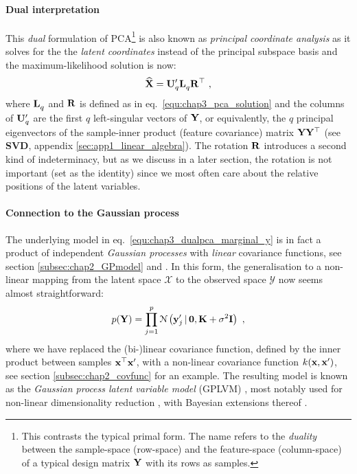       \paragraph{Dual interpretation} This \emph{dual} formulation of PCA\footnote{This contrasts the typical primal form. The name refers to the \emph{duality} between the sample-space (row-space) and the feature-space (column-space) of a typical design matrix $\mathbf{Y}$ with its rows as samples.} is also known as \textit{principal coordinate analysis} as it solves for the the \emph{latent coordinates} instead of the principal subspace basis and the maximum-likelihood solution is now:
      \[
        \widehat{\mathbf{X}} = \mathbf{U}^\prime_q \mathbf{L}^{~}_q \mathbf{R}^\top ~,
      \]
      where $\mathbf{L}^{~}_q$ and $\mathbf{R}$ is defined as in eq.~\eqref{equ:chap3_pca_solution} and the columns of $\mathbf{U}^\prime_q$ are the first $q$ left-singular vectors of $\mathbf{Y}$, or equivalently, the $q$ principal eigenvectors of the sample-inner product (feature covariance) matrix $\mathbf{Y}\mathbf{Y}^\top$ (see \textbf{SVD}, appendix \ref{sec:app1_linear_algebra}). The rotation $\mathbf{R}$ introduces a second kind of indeterminacy, but as we discuss in a later section, the rotation is not important (set as the identity) since we most often care about the relative positions of the latent variables.

      \paragraph{Connection to the Gaussian process} The underlying model in eq.~\eqref{equ:chap3_dualpca_marginal_y} is in fact a product of independent \emph{Gaussian processes} with \emph{linear} covariance functions, see section \ref{subsec:chap2_GPmodel} and \citep{Rasmussen:book06}. In this form, the generalisation to a non-linear mapping from the latent space $\mathcal{X}$ to the observed space $\mathcal{Y}$ now seems almost straightforward:
      \begin{equation*}
	p(\mathbf{Y}) = \prod_{j=1}^p \mathcal{N} \left( \mathbf{y}^{\prime}_j \,|\, \mathbf{0},  \mathbf{K} + \sigma^2\mathbf{I} \right) ~,
      \end{equation*}
      where we have replaced the (bi-)linear covariance function, defined by the inner product between samples $\mathbf{x}^\top \mathbf{x}^{\prime}$, with a non-linear covariance function $k(\mathbf{x},\mathbf{x}^\prime)$, see section \ref{subsec:chap2_covfunc} for an example. The resulting model is known as the \textit{Gaussian process latent variable model} (GPLVM) \citep{Lawrence:pnpca05}, most notably used for non-linear dimensionality reduction \citep{Lawrence:gplvm03}, with Bayesian extensions thereof \citep{Titsias:bayesGPLVM10, Damianou:vgpds11}. %

